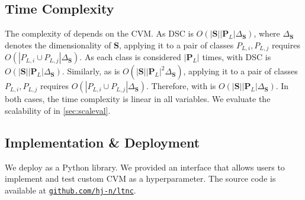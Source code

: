 \subsection{Time Complexity}

The complexity of \ltc depends on the CVM. 
As DSC is  $O(|\mathbf{S}||\mathbf{P}_L|\Delta_\mathbf{S})$, where  $\Delta_\mathbf{S}$ denotes the dimensionality of $\mathbf{S}$, applying it to a pair of classes $P_{L,i}, P_{L,j}$ requires $O(|P_{L,i} \cup P_{L,j}|\Delta_\mathbf{S})$. As each class is considered $|\mathbf{P}_L|$ times, \ltc with DSC is $O(|\mathbf{S}||\mathbf{P}_L|\Delta_\mathbf{S})$. 
Similarly, as \CHb is $O(|\mathbf{S}||\mathbf{P}_L|^2\Delta_\mathbf{S})$, applying it to a pair of classes $P_{L,i}, P_{L,j}$ requires $O(|P_{L, i} \cup P_{L, j}|\Delta_\mathbf{S})$. Therefore,  \ltc with \CHb is $O(|\mathbf{S}||\mathbf{P}_L|\Delta_\mathbf{S})$. In both cases, the time complexity is linear in all variables. We  evaluate the scalability of \ltc in \autoref{sec:scaleval}.



\subsection{Implementation \& Deployment}

We deploy \ltc as a Python library. We provided an interface that allows users to implement and test custom CVM as a hyperparameter. The source code is available at \href{https://github.com/hj-n/ltnc}{\texttt{github.com/hj-n/ltnc}}.

